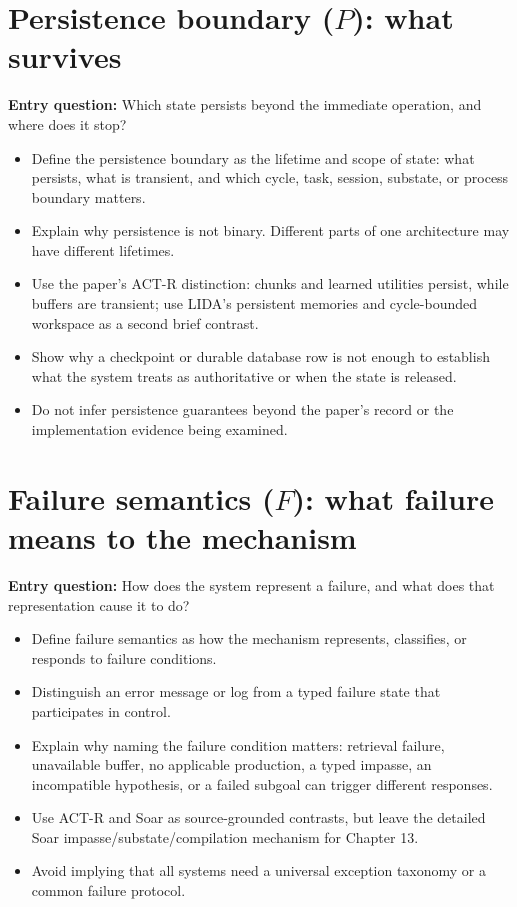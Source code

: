 \section{Persistence boundary ($P$): what survives}
\textbf{Entry question:} Which state persists beyond the immediate operation, and where does it stop?
\begin{itemize}
  \item Define the persistence boundary as the lifetime and scope of state: what persists, what is transient, and which cycle, task, session, substate, or process boundary matters.
  \item Explain why persistence is not binary. Different parts of one architecture may have different lifetimes.
  \item Use the paper's ACT-R distinction: chunks and learned utilities persist, while buffers are transient; use LIDA's persistent memories and cycle-bounded workspace as a second brief contrast.
  \item Show why a checkpoint or durable database row is not enough to establish what the system treats as authoritative or when the state is released.
  \item Do not infer persistence guarantees beyond the paper's record or the implementation evidence being examined.
\end{itemize}

\section{Failure semantics ($F$): what failure means to the mechanism}
\textbf{Entry question:} How does the system represent a failure, and what does that representation cause it to do?
\begin{itemize}
  \item Define failure semantics as how the mechanism represents, classifies, or responds to failure conditions.
  \item Distinguish an error message or log from a typed failure state that participates in control.
  \item Explain why naming the failure condition matters: retrieval failure, unavailable buffer, no applicable production, a typed impasse, an incompatible hypothesis, or a failed subgoal can trigger different responses.
  \item Use ACT-R and Soar as source-grounded contrasts, but leave the detailed Soar impasse/substate/compilation mechanism for Chapter 13.
  \item Avoid implying that all systems need a universal exception taxonomy or a common failure protocol.
\end{itemize}

